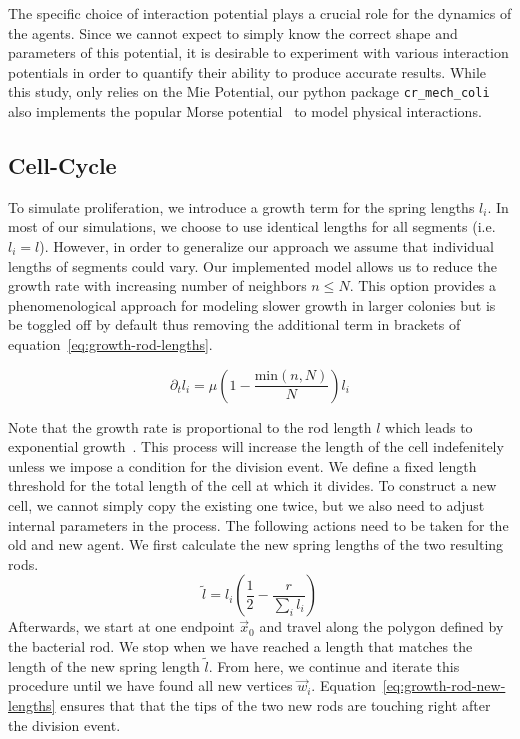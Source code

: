 \documentclass{article}
\begin{document}
The specific choice of interaction potential plays a crucial role for the dynamics of the agents.
Since we cannot expect to simply know the correct shape and parameters of this potential, it is
desirable to experiment with various interaction potentials in order to quantify their
ability to produce accurate results.
While this study, only relies on the Mie Potential, our python package \texttt{cr\_mech\_coli}
also implements the popular Morse potential~\cite{Morse1929} to model physical interactions.

\subsection{Cell-Cycle}

To simulate proliferation, we introduce a growth term for the spring lengths $l_i$.
In most of our simulations, we choose to use identical lengths for all segments (i.e. $l_i=l$).
However, in order to generalize our approach we assume that individual lengths of segments could
vary.
Our implemented model allows us to reduce the growth rate with increasing number of neighbors
$n\leq N$.
This option provides a phenomenological approach for modeling slower growth in larger colonies but
is be toggled off by default thus removing the additional term in brackets of
equation~\ref{eq:growth-rod-lengths}.

\begin{equation}
    \partial_t l_i = \mu\left(1-\frac{\text{min}(n,N)}{N}\right)l_i
    \label{eq:growth-rod-lengths}
\end{equation}

Note that the growth rate is proportional to the rod length $l$ which leads to exponential
growth~\cite{Robert2014,Takeuchi2005}.
This process will increase the length of the cell indefenitely unless we impose a condition for the
division event.
We define a fixed length threshold for the total length of the cell at which it divides.
To construct a new cell, we cannot simply copy the existing one twice, but we also need to adjust
internal parameters in the process.
The following actions need to be taken for the old and new agent.
We first calculate the new spring lengths of the two resulting rods.
\begin{equation}
    \tilde{l} = l_i\left(\frac{1}{2} - \frac{r}{\sum\limits_i l_i}\right)
    \label{eq:growth-rod-new-lengths}
\end{equation}
Afterwards, we start at one endpoint $\vec{x}_0$ and travel along the polygon defined by the
bacterial rod.
We stop when we have reached a length that matches the length of the new spring length $\tilde{l}$.
From here, we continue and iterate this procedure until we have found all new vertices $\vec{w}_i$.
Equation~\ref{eq:growth-rod-new-lengths} ensures that that the tips of the two new rods are touching
right after the division event.
\end{document}
